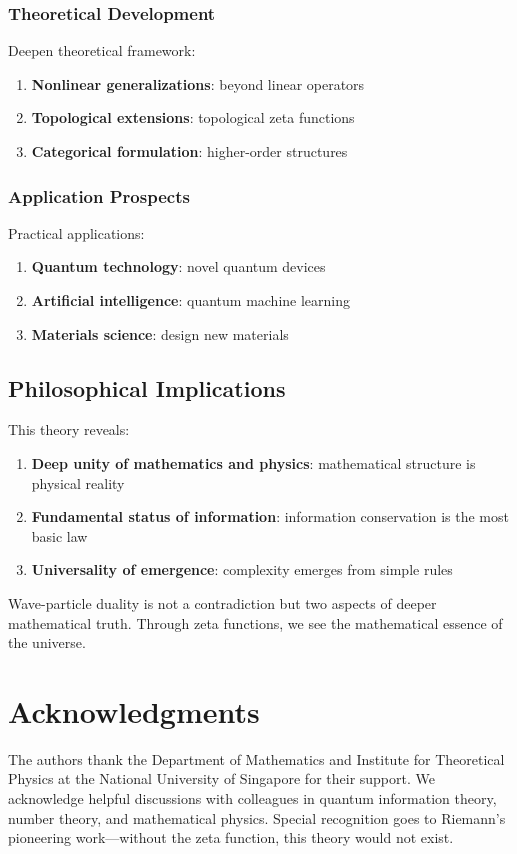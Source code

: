 \documentclass[11pt]{article}
\theoremstyle{plain}
\theoremstyle{definition}
\theoremstyle{remark}
\begin{document}
\subsubsection{Theoretical Development}

Deepen theoretical framework:
\begin{enumerate}
\item \textbf{Nonlinear generalizations}: beyond linear operators
\item \textbf{Topological extensions}: topological zeta functions
\item \textbf{Categorical formulation}: higher-order structures
\end{enumerate}

\subsubsection{Application Prospects}

Practical applications:
\begin{enumerate}
\item \textbf{Quantum technology}: novel quantum devices
\item \textbf{Artificial intelligence}: quantum machine learning
\item \textbf{Materials science}: design new materials
\end{enumerate}

\subsection{Philosophical Implications}

This theory reveals:
\begin{enumerate}
\item \textbf{Deep unity of mathematics and physics}: mathematical structure is physical reality
\item \textbf{Fundamental status of information}: information conservation is the most basic law
\item \textbf{Universality of emergence}: complexity emerges from simple rules
\end{enumerate}

Wave-particle duality is not a contradiction but two aspects of deeper mathematical truth. Through zeta functions, we see the mathematical essence of the universe.

\section*{Acknowledgments}

The authors thank the Department of Mathematics and Institute for Theoretical Physics at the National University of Singapore for their support. We acknowledge helpful discussions with colleagues in quantum information theory, number theory, and mathematical physics. Special recognition goes to Riemann's pioneering work—without the zeta function, this theory would not exist.



\end{document}
